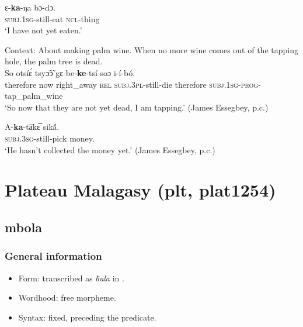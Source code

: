 \begin{exe}
	\ex
	\gll ɛ-\textbf{ka}-ŋa bɔ-dɔ.\\
	\textsc{subj}.1\textsc{sg}-still-eat \textsc{ncl}-thing\\
	\glt \lq I have not yet eaten.' \parencite[160]{Essegbey2019}

	\ex
	Context: About making palm wine. When no more wine comes out of the tapping hole, the palm tree is dead.\\
	\gll So otsíɛ́ tsyɔ̃ɔ̃ gɛ be-\textbf{ke}-tsí soɔ i-í-bó.\\
	therefore now right\_away \textsc{rel} \textsc{subj}.3\textsc{pl}-still-die therefore \textsc{subj}.1\textsc{sg}-\textsc{prog}-tap\_palm\_wine\\
	\glt \lq So now that they are not yet dead, I am tapping.\rq{ }(James Essegbey, p.c.)
	
	\ex\label{exAppendixNyangboNotYet3}
	\gll A-\textbf{ka}-ta̅kɛ̅ sikã́.\\
	\textsc{subj}.3\textsc{sg}-still-pick money.\\
	\glt \lq He hasn’t collected the money yet.' (James Essegbey, p.c.)
\end{exe}

\section{Plateau Malagasy (plt, plat1254)}\label{appendixMalagasy}
\subsection{mbola}
\subsubsection{General information}
\begin{itemize}
	\item Form: transcribed as \textit{b̃ula} in \textcite{Garvey1964}.
	\item Wordhood: free morpheme.
	\item Syntax: fixed, preceding the predicate.
\end{itemize}


